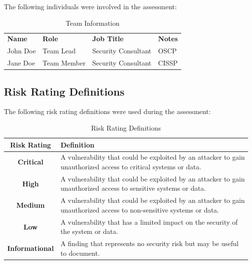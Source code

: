 \documentclass[11pt]{article}
\begin{document}
The following individuals were involved in the assessment:

\begin{table}[h]
\centering
\begin{tabular}{|l|l|l|l|}
\hline
\textbf{Name} & \textbf{Role} & \textbf{Job Title} & \textbf{Notes} \\
John Doe & Team Lead & Security Consultant & OSCP \\ \hline
Jane Doe & Team Member & Security Consultant & CISSP \\ \hline
\end{tabular}
\caption{Team Information}
\end{table}

\newpage

\subsection{Risk Rating Definitions}

The following risk rating definitions were used during the assessment:

\begin{table}[ht]
    \centering
    \begin{tabularx}{\textwidth}{|c|X|}
        \hline
        \textbf{Risk Rating} & \textbf{Definition} \\
        \hline
        \textbf{Critical} & A vulnerability that could be exploited by an attacker to gain unauthorized access to critical systems or data. \\
        \hline
        \textbf{High} & A vulnerability that could be exploited by an attacker to gain unauthorized access to sensitive systems or data. \\
        \hline
        \textbf{Medium} & A vulnerability that could be exploited by an attacker to gain unauthorized access to non-sensitive systems or data. \\
        \hline
        \textbf{Low} & A vulnerability that has a limited impact on the security of the system or data. \\
        \hline
        \textbf{Informational} & A finding that represents no security risk but may be useful to document. \\
        \hline
    \end{tabularx}
    \caption{Risk Rating Definitions}
\end{table}
\end{document}
